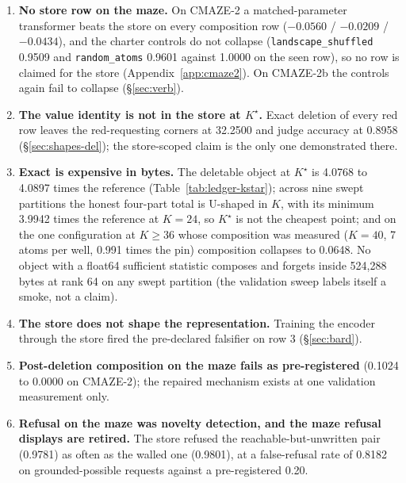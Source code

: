 \documentclass{article} %
\newcommand{\Kstar}{\ensuremath{K^{\star}}}
\begin{document}
\begin{enumerate}[leftmargin=*,itemsep=1pt]
\item \textbf{No store row on the maze.} On CMAZE-2 a matched-parameter transformer beats the
  store on every composition row ($-0.0560$ / $-0.0209$ / $-0.0434$), and the charter controls do
  not collapse (\texttt{landscape\_shuffled} 0.9509 and \texttt{random\_atoms} 0.9601 against
  1.0000 on the seen row), so no row is claimed for the store (Appendix~\ref{app:cmaze2}). On
  CMAZE-2b the controls again fail to collapse (\S\ref{sec:verb}). %
\item \textbf{The value identity is not in the store at $\Kstar$.} Exact deletion of every red
  row leaves the red-requesting corners at 32.2500 and judge accuracy at 0.8958
  (\S\ref{sec:shapes-del}); the store-scoped claim is the only one demonstrated there.
\item \textbf{Exact is expensive in bytes.} The deletable object at $\Kstar$ is 4.0768 to 4.0897
  times the reference (Table~\ref{tab:ledger-kstar}); across nine swept partitions the honest
  four-part total is U-shaped in $K$, with its minimum 3.9942 times the reference at $K=24$, so
  $\Kstar$ is not the cheapest point; and on the one configuration at $K\ge36$ whose composition
  was measured ($K=40$, 7 atoms per well, 0.991 times the pin) composition collapses to 0.0648.
  No object with a float64 sufficient statistic composes and forgets inside 524,288 bytes at rank
  64 on any swept partition (the validation sweep labels itself a smoke, not a claim).
\item \textbf{The store does not shape the representation.} Training the encoder through the
  store fired the pre-declared falsifier on row 3 (\S\ref{sec:bard}). %
\item \textbf{Post-deletion composition on the maze fails as pre-registered} (0.1024 to 0.0000
  on CMAZE-2); the repaired mechanism exists at one validation measurement only.
\item \textbf{Refusal on the maze was novelty detection, and the maze refusal displays are
  retired.} The store refused the reachable-but-unwritten pair (0.9781) as often as the walled
  one (0.9801), at a false-refusal rate of 0.8182 on grounded-possible requests against a
  pre-registered 0.20. %

\end{enumerate}
\end{document}
